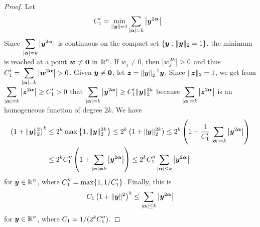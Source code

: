 \begin{proof}
 Let
\begin{equation} \label{sob_equi_Hk}
C_1' = \min_{\|{\bm{y}}\|=1} \sum_{|{\bm{\alpha}}|= k}
\left|{\bm{y}}^{2{\bm{\alpha}}}\right| \ .
\end{equation}
Since $\displaystyle \sum_{|{\bm{\alpha}}|= k}
\left|{\bm{y}}^{2{\bm{\alpha}}}\right|$ is 
continuous on the compact set $\{{\bm{y}} : \|{\bm{y}}\|_2=1\}$, the
minimum is reached at a point ${\bm{w}} \neq {\bm{0}}$ in $\displaystyle \mathbb{R}^n$.
If $w_j \neq 0$, then $\displaystyle \left| w_j^{2k}\right| >0$ and thus
$\displaystyle C_1' = \sum_{|{\bm{\alpha}}|= k}
\left|{\bm{w}}^{2{\bm{\alpha}}}\right| >0$.
Given ${\bm{y}} \neq {\bm{0}}$, let ${\bm{z}} = \|{\bm{y}}\|_2^{-1} {\bm{y}}$.
Since $\|{\bm{z}}\|_2 = 1$, we get from
$\displaystyle \sum_{|{\bm{\alpha}}|= k} \left|{\bm{z}}^{2{\bm{\alpha}}}\right| \geq
C_1' >0$ that
$\displaystyle \sum_{|{\bm{\alpha}}|= k} \left|{\bm{y}}^{2{\bm{\alpha}}}\right|
\geq C_1' \|{\bm{y}}\|_2^{2k}$
because $\displaystyle \sum_{|{\bm{\alpha}}|= k}
\left|{\bm{z}}^{2{\bm{\alpha}}}\right|$
is an homogeneous function of degree $2k$.  We have
\begin{align*}
\left(1+\|{\bm{y}}\|_2^2\right)^k &\leq
2^k \max\left\{1, \|{\bm{y}}\|_2^{2k}\right\}
\leq 2^k \left( 1+ \|{\bm{y}}\|_2^{2k}\right)
\leq 2^k \left( 1 + \frac{1}{C_1' } \sum_{|{\bm{\alpha}}|= k}
\left|{\bm{y}}^{2{\bm{\alpha}}}\right| \right) \\
&\leq 2^k C_1'' \left( 1 + \sum_{|{\bm{\alpha}}|= k}
\left|{\bm{y}}^{2{\bm{\alpha}}}\right| \right)
\leq 2^k C_1'' \sum_{|{\bm{\alpha}}|\leq k} \left|{\bm{y}}^{2{\bm{\alpha}}}\right|
\end{align*}
for $\displaystyle {\bm{y}} \in \mathbb{R}^n$, where
$\displaystyle C_1'' = \max \{ 1 , 1/C_1'\}$.
Finally, this is
\[
C_1 \left(1+\|{\bm{y}}\|^2\right)^k
\leq \sum_{|{\bm{\alpha}}|\leq k} \left|{\bm{y}}^{2{\bm{\alpha}}}\right|
\]
for $\displaystyle {\bm{y}} \in \mathbb{R}^n$, where
$\displaystyle C_1 = 1/(2^k C_1'')$.


\end{proof}

